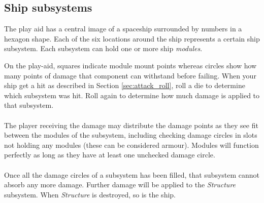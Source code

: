 \documentclass[a4paper,12pt,notitlepage,twocolumn]{article}
\begin{document}
\subsection{Ship subsystems}
\label{sec:ship_subsystems}

The play aid has a central image of a spaceship surrounded by
numbers in a hexagon shape. Each of the six locations around the
ship represents a certain ship subsystem. Each subsystem can hold one
or more ship \emph{modules}.

On the play-aid, squares indicate module mount points whereas circles 
show how many points of damage that component can withstand before failing. 
When your ship get a hit as described in Section \ref{sec:attack_roll}, 
roll a die to determine which subsystem was hit. Roll again to determine 
how much damage is applied to that subsystem. 
\\\\
The player receiving the damage may distribute the damage points as 
they see fit between the modules of the subsystem, including checking
damage circles in slots not holding any modules (these can be considered armour). 
Modules will function perfectly as long as they have at least one unchecked damage circle.
\\\\
Once all the damage circles of a subsystem has been filled, that subsystem
cannot absorb any more damage. Further damage will be applied to the \emph{Structure}
subsystem. When \emph{Structure} is destroyed, so is the ship.
\end{document}
